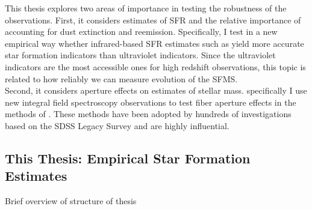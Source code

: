 This thesis explores two areas of importance in testing the robustness
of the observations. First, it considers estimates of SFR and the
relative importance of accounting for dust extinction and reemission.
Specifically, I test in a new empirical way whether infrared-based SFR
estimates such as \citet{da_cunha_simple_2008} yield more accurate star 
formation indicators than ultraviolet indicators. Since the ultraviolet
indicators are the most accessible ones for high redshift
observations, this topic is related to how reliably we can measure
evolution of the SFMS.\\

Second, it considers aperture effects on estimates of stellar mass.
specifically I use new integral field spectroscopy observations to
test fiber aperture effects in the methods of
\citet{kauffmann_stellar_2003}. These methods have been adopted by
hundreds of investigations based on the SDSS Legacy Survey and are
highly influential.

\subsection{This Thesis: Empirical Star Formation Estimates}
Brief overview of structure of thesis







